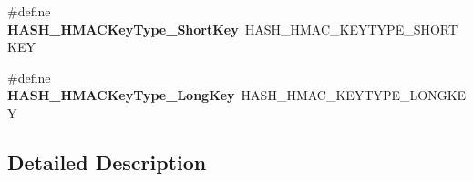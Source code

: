 \begin{DoxyCompactItemize}
\mbox{\label{group___h_a_l___h_a_s_h___aliased___functions_ga75d858a8b5b891edc321486eebe74692}} 
\#define {\bfseries H\+A\+S\+H\+\_\+\+H\+M\+A\+C\+Key\+Type\+\_\+\+Short\+Key}~H\+A\+S\+H\+\_\+\+H\+M\+A\+C\+\_\+\+K\+E\+Y\+T\+Y\+P\+E\+\_\+\+S\+H\+O\+R\+T\+K\+EY
\item 
\mbox{\label{group___h_a_l___h_a_s_h___aliased___functions_ga99296878d9ed1d3ede590fdeef8f8394}} 
\#define {\bfseries H\+A\+S\+H\+\_\+\+H\+M\+A\+C\+Key\+Type\+\_\+\+Long\+Key}~H\+A\+S\+H\+\_\+\+H\+M\+A\+C\+\_\+\+K\+E\+Y\+T\+Y\+P\+E\+\_\+\+L\+O\+N\+G\+K\+EY
\end{DoxyCompactItemize}


\subsection{Detailed Description}
